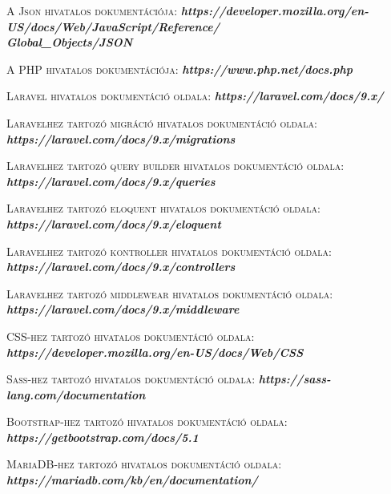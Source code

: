 \documentclass[
]{thesis-ekf}
\theoremstyle{definition}
\theoremstyle{remark}
\begin{document}
\begin{thebibliography}{2}
\textsc{A Json hivatalos dokumentációja:}
\newline
\emph{\bf{https://developer.mozilla.org/en-US/docs/Web/JavaScript/Reference/\\Global\_Objects/JSON}}

\textsc{A PHP hivatalos dokumentációja:}
\newline
\emph{\bf{https://www.php.net/docs.php}}

\textsc{Laravel hivatalos dokumentáció oldala:}
\newline
\emph{\bf{https://laravel.com/docs/9.x/}}

\textsc{Laravelhez tartozó migráció hivatalos dokumentáció oldala:}
\newline
\emph{\bf{https://laravel.com/docs/9.x/migrations}}

\textsc{Laravelhez tartozó query builder hivatalos dokumentáció oldala:}
\newline
\emph{\bf{https://laravel.com/docs/9.x/queries}}

\textsc{Laravelhez tartozó eloquent hivatalos dokumentáció oldala:}
\newline
\emph{\bf{https://laravel.com/docs/9.x/eloquent}}

\textsc{Laravelhez tartozó kontroller hivatalos dokumentáció oldala:}
\newline
\emph{\bf{https://laravel.com/docs/9.x/controllers}}

\textsc{Laravelhez tartozó middlewear hivatalos dokumentáció oldala:}
\newline
\emph{\bf{https://laravel.com/docs/9.x/middleware}}

\textsc{CSS-hez tartozó hivatalos dokumentáció oldala:}
\newline
\emph{\bf{https://developer.mozilla.org/en-US/docs/Web/CSS}}

\textsc{Sass-hez tartozó hivatalos dokumentáció oldala:}
\newline
\emph{\bf{https://sass-lang.com/documentation}}

\textsc{Bootstrap-hez tartozó hivatalos dokumentáció oldala:}
\newline
\emph{\bf{https://getbootstrap.com/docs/5.1}}

\textsc{MariaDB-hez tartozó hivatalos dokumentáció oldala:}
\newline
\emph{\bf{https://mariadb.com/kb/en/documentation/}}


\end{thebibliography}
\end{document}
